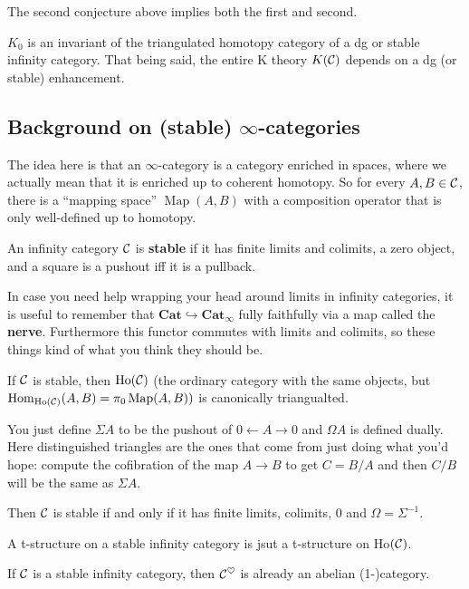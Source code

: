\documentclass[12pt]{article}
\begin{document}
The second conjecture above implies both the first and second.
\begin{rmk}
	$K_0$ is an invariant of the triangulated homotopy category of a dg or stable infinity category. That being said, 
	the entire K theory $K(\mathcal{C})$ depends on a dg (or stable) enhancement.
\end{rmk}

\subsection{Background on (stable) \texorpdfstring{$\infty$}{infty}-categories}
The idea here is that an $\infty$-category is a category enriched in spaces, where we actually mean that it is enriched up to coherent homotopy.
So for every $A,B\in\mathcal{C}$, there is a ``mapping space'' $\operatorname{Map}(A,B)$ with a composition operator that is only well-defined up to homotopy.

\begin{defn}
	An infinity category $\mathcal{C}$ is \textbf{stable} if it has finite limits and colimits, a zero object, and a square is a pushout iff it is a pullback.
\end{defn}
\begin{rmk}
	In case you need help wrapping your head around limits in infinity categories, it is useful to remember that $\mathbf{Cat}\hookrightarrow\mathbf{Cat}_\infty$
	fully faithfully via a map called the \textbf{nerve}. Furthermore this functor commutes with limits and colimits, so these things kind of what you think they should be.
\end{rmk}
\begin{rmk}
	If $\mathcal{C}$ is stable, then $\operatorname{Ho}(\mathcal{C})$ (the ordinary category with the same objects, but $\operatorname{Hom}_{\text{Ho}(\mathcal{C})}(A,B)=\pi_0\operatorname{Map}(A,B))$ is canonically triangualted.
\end{rmk}

You just define $\Sigma A$ to be the pushout of $0\leftarrow A\to 0$ and $\Omega A$ is defined dually. Here distinguished triangles are the ones that come from just doing what you'd hope: compute the cofibration of the 
map $A\to B$ to get $C=B/A$ and then $C/B$ will be the same as $\Sigma A$.

Then $\mathcal{C}$ is stable if and only if it has finite limits, colimits, 0 and $\Omega=\Sigma^{-1}$.

\begin{defn}
	A t-structure on a stable infinity category is jsut a t-structure on Ho$(\mathcal{C})$.
\end{defn}
\begin{rmk}
	If $\mathcal{C}$ is a stable infinity category, then $\mathcal{C}^\heartsuit$ is already an abelian (1-)category.
\end{rmk}
\end{document}
